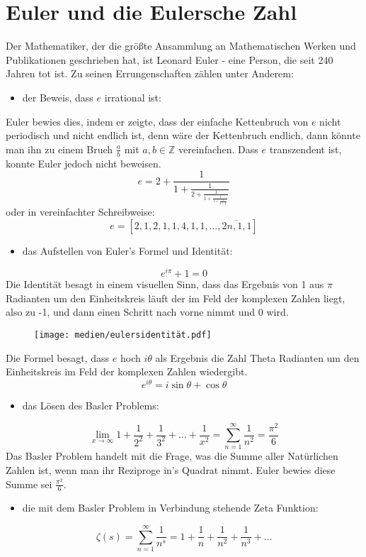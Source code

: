 \section{Euler und die Eulersche Zahl}
Der Mathematiker, der die größte Ansammlung an Mathematischen Werken und Publikationen geschrieben hat, ist Leonard Euler - eine Person, die seit 240 Jahren tot ist. Zu seinen Errungenschaften zählen unter Anderem: 
\begin{itemize}
  \item der Beweis, dass $e$ irrational ist:
\end{itemize}
Euler bewies dies, indem er zeigte, dass der einfache Kettenbruch von $e$ nicht periodisch und nicht endlich ist, denn wäre der Kettenbruch endlich, dann könnte man ihn zu einem Bruch $\frac{a}{b}$ mit $a,b \in \mathbb{Z}$ vereinfachen. Dass $e$ transzendent ist, konnte Euler jedoch nicht beweisen. \[
e = 2 +\frac{1}{1 + \frac{1}{2 + \frac{1}{1 + \frac{1}{1 + \frac{1}{4 + \frac{1}{\ddots}}}}}} \] 
oder in vereinfachter Schreibweise: \[
e = [2,1,2,1,1,4,1,1,\dots,\overline{2n,1,1}] \]
\begin{itemize}
  \item das Aufstellen von Euler's Formel und Identität:
\end{itemize}\[
e^{i\pi} + 1 = 0 \]
Die Identität besagt in einem visuellen Sinn, dass das Ergebnis von 1 aus $\pi$ Radianten um den Einheitskreis läuft der im Feld der komplexen Zahlen liegt, also zu -1, und dann einen Schritt nach vorne nimmt und 0 wird.
\begin{figure}[h]
\texttt{[image: medien/eulersidentität.pdf]}
\centering
\end{figure}
\newpage
\par Die Formel besagt, dass $e$ hoch $i\theta$ als Ergebnis die Zahl Theta Radianten um den Einheitskreis im Feld der komplexen Zahlen wiedergibt.
\[ e^{i\theta} = i\sin{\theta} + \cos{\theta} \] 
\begin{itemize}
  \item das Lösen des Basler Problems:
\end{itemize} \[
\lim_{x\to\infty} 1 + \frac{1}{2^2} + \frac{1}{3^2} + \dots + \frac{1}{x^2} = \sum_{n=1}^{\infty} \frac{1}{n^2} = \frac{\pi^2}{6}\]
Das Basler Problem handelt mit die Frage, was die Summe aller Natürlichen Zahlen ist, wenn man ihr Reziproge in's Quadrat nimmt. Euler bewies diese Summe sei $\frac{\pi^2}{6}$.
\begin{itemize}
  \item die mit dem Basler Problem in Verbindung stehende Zeta Funktion:
\end{itemize} \[
\zeta(s) = \sum_{n=1}^{\infty} \frac{1}{n^s} = 1 + \frac{1}{n} + \frac{1}{n^2} + \frac{1}{n^3} + \dots \]
